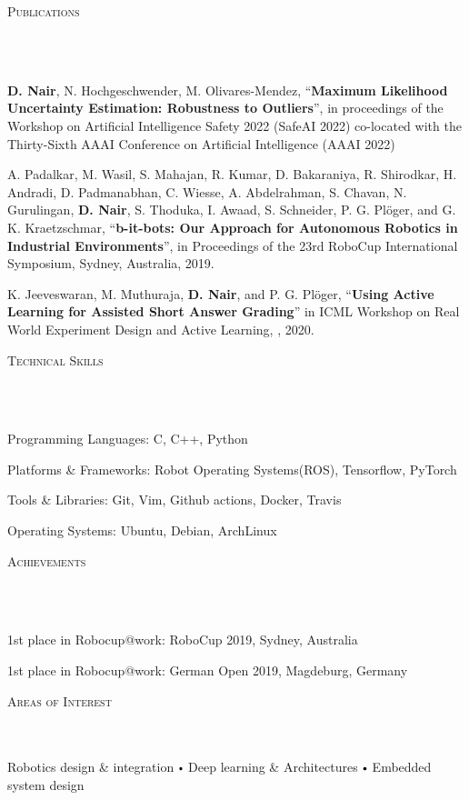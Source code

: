 \documentclass{article}
\newcommand{\header}[1]{{
\hspace*{-15pt}\vspace*{6pt} \textsc{#1}} \vspace*{-6pt} 
\lineunder
}
\newcommand{\lineunder}{
\vspace*{-8pt} \\ \hspace*{-18pt} 
\hrulefill \\
}
\newcommand{\content}{
\vspace*{2pt}%
}
\renewcommand{\labelitemi}{
$\vcenter{\hbox{\tiny$\bullet$}}$\hspace*{3pt}
}
\renewcommand{\labelitemii}{
$\vcenter{\hbox{\tiny$\bullet$}}$\hspace*{-3pt}
}
\newenvironment{bullet-list-major}{
\begin{list}{\labelitemii}{\setlength\leftmargin{3pt} 
\topsep 0pt \itemsep -2pt}}{\vspace*{4pt}\end{list}
}
\begin{document}
  
\vspace*{4pt}%
\header{Publications}
\begin{bullet-list-major}
 \item \textbf{D. Nair}, N. Hochgeschwender, M. Olivares-Mendez,  ``\textbf{Maximum Likelihood Uncertainty Estimation: Robustness to Outliers}'', in proceedings of the Workshop on Artificial Intelligence Safety 2022 (SafeAI 2022)
co-located with the Thirty-Sixth AAAI Conference on Artificial Intelligence (AAAI 2022) 
 \item A. Padalkar, M. Wasil, S. Mahajan, R. Kumar, D. Bakaraniya, R. Shirodkar, H. Andradi, D. Padmanabhan, C. Wiesse, A. Abdelrahman, S. Chavan, N. Gurulingan, \textbf{D. Nair}, S. Thoduka, I. Awaad, S. Schneider, P. G. Pl\"{o}ger, and G. K. Kraetzschmar, ``\textbf{b-it-bots: Our Approach for Autonomous Robotics in Industrial Environments}'', in Proceedings of the 23rd RoboCup International Symposium, Sydney, Australia, 2019. 
 \item K. Jeeveswaran, M. Muthuraja, \textbf{D. Nair}, and P. G. Pl\"{o}ger, ``\textbf{Using Active Learning for Assisted Short Answer Grading}'' in ICML Workshop on Real World Experiment Design and Active Learning, , 2020. 
\end{bullet-list-major}

\vspace*{4pt}%
\header{Technical Skills}
    \begin{bullet-list-major}
    \item Programming Languages: C, C++, Python
    \vspace{2pt}
    \item Platforms \& Frameworks: Robot Operating Systems(ROS), Tensorflow, PyTorch
    \vspace{2pt}
    \item Tools \& Libraries: Git, Vim, Github actions, Docker, Travis
    \vspace{2pt}
    \item Operating Systems: Ubuntu, Debian, ArchLinux
    \end{bullet-list-major}

\vspace*{4pt}%
\header{Achievements}
    \begin{bullet-list-major}
    \item 1st place in Robocup@work: RoboCup 2019, Sydney, Australia
    \item 1st place in Robocup@work: German Open 2019, Magdeburg, Germany
    \end{bullet-list-major}

\vspace*{4pt}%
\header{Areas of Interest}
    \content{Robotics design \& integration \labelitemi Deep learning \& Architectures \labelitemi Embedded system design  \vspace{5pt}}
\end{document}
